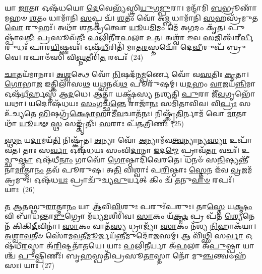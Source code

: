 {\anuvakamend[{𑌸𑌮𑍋᳴𑌕𑌸𑍗 𑌵𑌿𑌶𑍍𑌵𑌰𑍂𑌪𑍇 \ul{𑌵𑌿}\-𑌦𑍁𑌰𑍍𑌨𑌿𑌰𑍍\mbox{}𑌋᳴𑌤𑌿\-\ul{𑌰}\-𑌭𑌿 𑌚᳴𑌷𑍍𑌟 \ul{𑌇}\-𑌹 \ul{𑌮𑌿}\-𑌤𑍍𑌰𑌾\-\ul{𑌯} 𑌦𑍍𑌵𑌾𑌵𑌿𑍞᳴𑌶𑌤𑌿𑌶𑍍𑌚}]}%

𑌯𑌾 \ul{𑌜𑌾}\-𑌤𑌾 𑌓𑌷᳴𑌧𑌯𑍋 \ul{𑌦𑍇}\-𑌵𑍇𑌭𑍍𑌯᳴𑌸𑍍𑌤𑍍𑌰𑌿\-\ul{𑌯𑍁}\-𑌗\-\ul{𑌮𑍍𑌪𑍁}\-𑌰𑌾। 𑌮𑌨𑍍𑌦𑌾᳴𑌮𑌿 \ul{𑌬}\-𑌭𑍍𑌰𑍂𑌣𑌾᳴𑌮𑌹𑍞 \ul{𑌶}\-𑌤𑌂 𑌧𑌾𑌮𑌾᳴𑌨𑌿 \ul{𑌸}\-𑌪𑍍𑌤 𑌚᳴। \ul{𑌶}\-𑌤𑌂 𑌵𑍋᳴ 𑌅\-\ul{𑌮𑍍𑌬} 𑌧𑌾𑌮𑌾᳴𑌨𑌿 \ul{𑌸}\-𑌹𑌸𑍍𑌰᳴𑌮𑍁𑌤 \ul{𑌵𑍋} 𑌰𑍁𑌹𑌃᳴। 𑌅𑌥𑌾᳴ 𑌶𑌤𑌕𑍍𑌰𑌤𑍍𑌵𑍋 \ul{𑌯𑍂}\-𑌯\-\ul{𑌮𑌿}\-𑌮𑌂 𑌮𑍇᳴ 𑌅\-\ul{𑌗}\-𑌦𑌂 𑌕𑍃᳴𑌤। 𑌪𑍁𑌷𑍍𑌪𑌾᳴𑌵𑌤𑍀𑌃 \ul{𑌪𑍍𑌰}\-𑌸𑍂𑌵᳴𑌤𑍀𑌃 \ul{𑌫}\-𑌲𑌿𑌨𑍀᳴𑌰\-\ul{𑌫}\-𑌲𑌾 \ul{𑌉}\-𑌤। 𑌅𑌶𑍍𑌵𑌾᳴ 𑌇𑌵 \ul{𑌸}\-𑌜𑌿𑌤𑍍𑌵᳴𑌰𑍀\-\ul{𑌰𑍍𑌵𑍀}\-𑌰𑍁𑌧𑌃᳴ 𑌪𑌾𑌰\-\ul{𑌯𑌿}\-𑌷𑍍𑌣𑌵𑌃᳴। 𑌓𑌷᳴\-\ul{𑌧𑍀}\-𑌰𑌿𑌤𑌿᳴ 𑌮𑌾𑌤\-\ul{𑌰}\-𑌸𑍍𑌤𑌦𑍍𑌵𑍋᳴ 𑌦𑍇\-\ul{𑌵𑍀}\-𑌰𑍁𑌪᳴ 𑌬𑍍𑌰𑍁𑌵𑍇। 𑌰𑌪𑌾𑍞᳴𑌸𑌿 𑌵𑌿\-\ul{𑌘𑍍𑌨}\-𑌤𑍀𑌰𑌿᳴\-\ul{𑌤} 𑌰𑌪𑌃᳴~(24)

\-\ul{𑌚𑌾}\-𑌤𑌯᳴𑌮𑌾𑌨𑌾𑌃। \ul{𑌅}\-\-\ul{𑌶𑍍𑌵}\-𑌤𑍍𑌥𑍇 𑌵𑍋᳴ \ul{𑌨𑌿}\-𑌷𑌦᳴𑌨\-\ul{𑌮𑍍𑌪}\-𑌰𑍍𑌣𑍇 𑌵𑍋᳴ 𑌵\-\ul{𑌸}\-𑌤𑌿𑌃 \ul{𑌕𑍃}\-𑌤𑌾। \ul{𑌗𑍋}\-𑌭𑌾\-\ul{𑌜} 𑌇𑌤𑍍𑌕𑌿𑌲𑌾᳴𑌸\-\ul{𑌥} 𑌯\-\ul{𑌥𑍍𑌸}\-𑌨𑌵᳴\-\ul{𑌥} 𑌪𑍂𑌰𑍁᳴𑌷𑌮𑍍। 𑌯\-\ul{𑌦}\-𑌹𑌂 \ul{𑌵𑌾}\-𑌜𑌯᳴\-\ul{𑌨𑍍𑌨𑌿}\-𑌮𑌾 𑌓𑌷᳴\-\ul{𑌧𑍀}\-𑌰𑍍\mbox{}𑌹𑌸𑍍𑌤᳴ 𑌆\-\ul{𑌦}\-𑌧𑍇। \ul{𑌆}\-𑌤𑍍𑌮𑌾 𑌯𑌕𑍍𑌷𑍍𑌮᳴𑌸𑍍𑌯 𑌨𑌶𑍍𑌯𑌤𑌿 \ul{𑌪𑍁}\-𑌰𑌾 𑌜𑍀᳴\-\ul{𑌵}\-𑌗𑍃𑌭𑍋᳴ 𑌯𑌥𑌾। 𑌯𑌦𑍋𑌷᳴𑌧𑌯𑌃 \ul{𑌸𑌂}\-𑌗𑌚𑍍𑌛᳴\-\ul{𑌨𑍍𑌤𑍇} 𑌰𑌾𑌜𑌾᳴\-\ul{𑌨𑌃} 𑌸𑌮𑌿᳴𑌤𑌾𑌵𑌿𑌵। 𑌵𑌿\-\ul{𑌪𑍍𑌰𑌃} 𑌸 𑌉᳴𑌚𑍍𑌯𑌤𑍇 \ul{𑌭𑌿}\-𑌷𑌗𑍍𑌰᳴\-\ul{𑌕𑍍𑌷𑍋}\-𑌹𑌾𑌮𑍀᳴\-\ul{𑌵}\-𑌚𑌾𑌤᳴𑌨𑌃। 𑌨𑌿𑌷𑍍𑌕𑍃᳴\-\ul{𑌤𑌿}\-𑌰𑍍𑌨𑌾𑌮᳴ 𑌵𑍋 \ul{𑌮𑌾}\-𑌤𑌾𑌥𑌾᳴ \ul{𑌯𑍂}\-𑌯𑍟 \ul{𑌸𑍍𑌥} 𑌸𑌙𑍍𑌕𑍃᳴𑌤𑍀𑌃। \ul{𑌸}\-𑌰𑌾𑌃 𑌪᳴\-\ul{𑌤}\-𑌤𑍍𑌰𑌿𑌣𑍀𑌃॑~(25)

\-\ul{𑌸𑍍𑌥}\-\-\ul{𑌨} 𑌯\-\ul{𑌦𑌾}\-𑌮𑌯᳴\-\ul{𑌤𑌿} 𑌨𑌿𑌷𑍍𑌕𑍃᳴𑌤। \ul{𑌅}\-𑌨𑍍𑌯𑌾 𑌵𑍋᳴ \ul{𑌅}\-𑌨𑍍𑌯𑌾𑌮᳴𑌵\-\ul{𑌤𑍍𑌵}\-𑌨𑍍𑌯𑌾𑌨𑍍𑌯\-\ul{𑌸𑍍𑌯𑌾} 𑌉𑌪𑌾᳴𑌵𑌤। 𑌤𑌾𑌃 𑌸\-\ul{𑌰𑍍𑌵𑌾} 𑌓𑌷᳴𑌧𑌯𑌃 𑌸𑌂𑌵𑌿\-\ul{𑌦𑌾}\-𑌨𑌾 \ul{𑌇}\-𑌦\-\ul{𑌮𑍍𑌮𑍇} 𑌪𑍍𑌰𑌾𑌵᳴\-\ul{𑌤𑌾} 𑌵𑌚𑌃᳴। 𑌉𑌚𑍍𑌛𑍁\-\ul{𑌷𑍍𑌮𑌾} 𑌓𑌷᳴𑌧𑍀\-\ul{𑌨𑌾𑌂} 𑌗𑌾𑌵𑍋᳴ \ul{𑌗𑍋}\-𑌷𑍍𑌠𑌾𑌦𑌿᳴𑌵𑍇𑌰𑌤𑍇। 𑌧𑌨𑍞᳴ 𑌸\-\ul{𑌨𑌿}\-𑌷𑍍𑌯𑌨𑍍𑌤𑍀᳴𑌨𑌾\-\ul{𑌮𑌾}\-𑌤𑍍𑌮𑌾\-\ul{𑌨𑌂} 𑌤𑌵᳴ 𑌪𑍂𑌰𑍁𑌷। 𑌅\-\ul{𑌤𑌿} 𑌵𑌿𑌶𑍍𑌵𑌾𑌃॑ 𑌪\-\ul{𑌰𑌿}\-𑌷𑍍𑌠𑌾𑌃 \ul{𑌸𑍍𑌤𑍇}\-𑌨 𑌇᳴𑌵 \ul{𑌵𑍍𑌰}\-𑌜𑌮᳴𑌕𑍍𑌰𑌮𑍁𑌃। 𑌓𑌷᳴𑌧\-\ul{𑌯𑌃} 𑌪𑍍𑌰𑌾𑌚𑍁᳴𑌚𑍍𑌯\-\ul{𑌵𑍁}\-𑌰𑍍𑌯𑌤𑍍 𑌕𑌿𑌂 𑌚᳴ \ul{𑌤}\-𑌨𑍁\-\ul{𑌵𑌾}\-\-\ul{𑍞} 𑌰𑌪𑌃᳴। 𑌯𑌾𑌃~(26)

\-\ul{𑌤} \ul{𑌆}\-\-\ul{𑌤}\-𑌸𑍍𑌥𑍁\-\ul{𑌰𑌾}\-𑌤𑍍𑌮𑌾\-\ul{𑌨𑌂} 𑌯𑌾 𑌆᳴𑌵𑌿\-\ul{𑌵𑌿}\-𑌶𑍁𑌃 𑌪𑌰𑍁𑌃᳴𑌪𑌰𑍁𑌃। 𑌤𑌾\-\ul{𑌸𑍍𑌤𑍇} 𑌯\-\ul{𑌕𑍍𑌷𑍍𑌮𑌂} 𑌵𑌿 𑌬𑌾᳴𑌧𑌨𑍍𑌤𑌾\-\ul{𑌮𑍁}\-𑌗𑍍𑌰𑍋 𑌮᳴𑌧𑍍𑌯\-\ul{𑌮}\-𑌶𑍀𑌰𑌿᳴𑌵। \ul{𑌸𑌾}\-𑌕𑌂 𑌯᳴\-\ul{𑌕𑍍𑌷𑍍𑌮} 𑌪𑍍𑌰 𑌪᳴𑌤 \ul{𑌶𑍍𑌯𑍇}\-𑌨𑍇𑌨᳴ 𑌕𑌿𑌕𑌿\-\ul{𑌦𑍀}\-𑌵𑌿𑌨𑌾॑। \ul{𑌸𑌾}\-𑌕𑌂 𑌵𑌾𑌤᳴\-\ul{𑌸𑍍𑌯} 𑌧𑍍𑌰𑌾𑌜𑍍𑌯𑌾᳴ \ul{𑌸𑌾}\-𑌕𑌂 𑌨᳴𑌶𑍍𑌯 \ul{𑌨𑌿}\-𑌹𑌾𑌕᳴𑌯𑌾। \ul{𑌅}\-\-\ul{𑌶𑍍𑌵𑌾}\-\-\ul{𑌵}\-𑌤𑍀𑍞 𑌸𑍋᳴𑌮\-\ul{𑌵}\-𑌤𑍀\-\ul{𑌮𑍂}\-𑌰𑍍𑌜𑌯᳴\-\ul{𑌨𑍍𑌤𑍀}\-\-𑌮𑍁𑌦𑍋᳴𑌜𑌸𑌮𑍍। 𑌆 𑌵𑌿᳴\-\ul{𑌥𑍍𑌸𑌿} 𑌸\-\ul{𑌰𑍍𑌵𑌾} 𑌓𑌷᳴𑌧𑍀\-\ul{𑌰}\-𑌸𑍍𑌮𑌾 𑌅᳴\-\ul{𑌰𑌿}\-𑌷𑍍𑌟𑌤𑌾᳴𑌤𑌯𑍇। 𑌯𑌾𑌃 \ul{𑌫}\-𑌲𑌿\-\ul{𑌨𑍀}\-𑌰𑍍𑌯𑌾 𑌅᳴\-\ul{𑌫}\-𑌲𑌾 𑌅᳴\-\ul{𑌪𑍁}\-𑌷𑍍𑌪𑌾 𑌯𑌾𑌶𑍍𑌚᳴ \ul{𑌪𑍁}\-𑌷𑍍𑌪𑌿𑌣𑍀𑌃॑। 𑌬𑍃\-\ul{𑌹}\-𑌸𑍍𑌪𑌤𑌿᳴𑌪𑍍𑌰𑌸𑍂\-\ul{𑌤𑌾}\-𑌸𑍍𑌤𑌾 𑌨𑍋᳴ 𑌮𑍁\-\ul{𑌞𑍍𑌚}\-𑌨𑍍𑌤𑍍𑌵𑍞𑌹᳴𑌸𑌃। 𑌯𑌾𑌃~(27)

